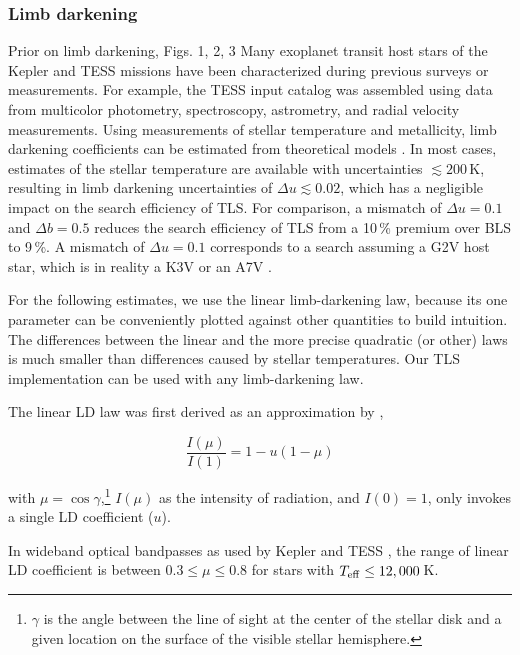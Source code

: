 \documentclass[twocolumn,tighten,longauthor]{myaastex62}
\begin{document}
\subsubsection{Limb darkening}
Prior on limb darkening, Figs. 1, 2, 3
Many exoplanet transit host stars of the Kepler and TESS missions have been characterized during previous surveys or measurements. For example, the TESS input catalog \citep{2018AJ....156..102S} was assembled using data from multicolor photometry, spectroscopy, astrometry, and radial velocity measurements. Using measurements of stellar temperature and metallicity, limb darkening coefficients can be estimated from theoretical models \citep[e.g.,][]{2011A&A...529A..75C}. In most cases, estimates of the stellar temperature are available with uncertainties $\lesssim 200\,$K, resulting in limb darkening uncertainties of $\Delta u \lesssim 0.02$, which has a negligible impact on the search efficiency of TLS. For comparison, a mismatch of $\Delta u = 0.1$ and $\Delta b=0.5$ reduces the search efficiency of TLS from a 10\,\% premium over BLS to 9\,\%. A mismatch of $\Delta u = 0.1$ corresponds to a search assuming a G2V host star, which is in reality a K3V or an A7V .

For the following estimates, we use the linear limb-darkening law, because its one parameter can be conveniently plotted against other quantities to build intuition. The differences between the linear and the more precise quadratic (or other) laws is much smaller than differences caused by stellar temperatures. Our TLS implementation can be used with any limb-darkening law.

The linear LD law was first derived as an approximation by \citet{1921MNRAS..81..361M},

\begin{equation}
\frac{I(\mu)}{I(1)} = 1- u(1-\mu)
\end{equation}

\noindent
with $\mu=\cos{\gamma}$,\footnote{$\gamma$ is the angle between the line of sight at the center of the stellar disk and a given location on the surface of the visible stellar hemisphere.} $I({\mu})$ as the intensity of radiation, and $I(0)=1$, only invokes a single LD coefficient ($u$).

In wideband optical bandpasses as used by Kepler \citep{2012A&A...546A..14C,2013A&A...552A..16C} and TESS \citep{2017A&A...600A..30C}, the range of linear LD coefficient is between $0.3\leq\mu\leq0.8$ for stars with $T_{\rm eff}\leq12,000\,$K.
\end{document}
